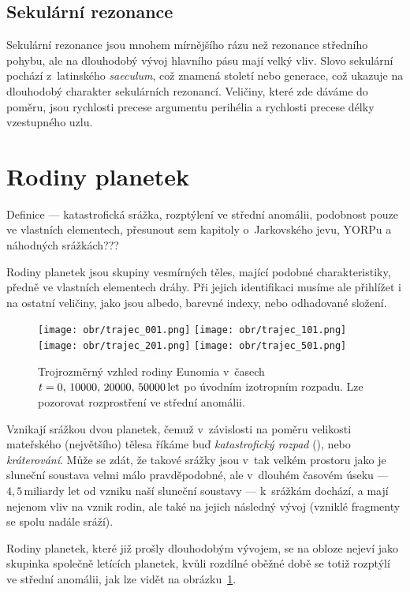 \documentclass[A4paper, 12pt, oneside]{book}%
\newcommand{\I}[1]{\textit{#1}}
\begin{document}
\subsection{Sekulární rezonance} 
Sekulární rezonance jsou mnohem mírnějšího rázu než rezonance středního pohybu, ale na dlouhodobý vývoj hlavního pásu mají velký vliv. Slovo sekulární pochází z~latinského \I{saeculum}, což znamená století nebo generace, což ukazuje na dlouhodobý charakter sekulárních rezonancí. Veličiny, které zde dáváme do poměru, jsou rychlosti precese argumentu perihélia a rychlosti precese délky vzestupného uzlu. 
\section{Rodiny planetek}


Definice --- katastrofická srážka, rozptýlení ve střední anomálii, podobnost pouze ve vlastních elementech, přesunout sem kapitoly o~Jarkovského jevu, YORPu a náhodných srážkách???

Rodiny planetek jsou skupiny vesmírných těles, mající podobné charakteristiky, předně ve vlastních elementech dráhy. Při jejich identifikaci musíme ale přihlížet i na ostatní veličiny, jako jsou albedo, barevné indexy, nebo odhadované složení. 

\begin{figure}
	\centering
	\texttt{[image: obr/trajec\_001.png]}
	\texttt{[image: obr/trajec\_101.png]} \\
	\texttt{[image: obr/trajec\_201.png]}
	\texttt{[image: obr/trajec\_501.png]}
	\caption{Trojrozměrný vzhled rodiny Eunomia v~časech $t=0,\,10000,\,20000,\,50000\,{\rm let}$ po úvodním izotropním rozpadu. Lze pozorovat rozprostření ve střední anomálii.} \label{fig:trajec}
\end{figure}

Vznikají srážkou dvou planetek, čemuž v~závislosti na poměru velikosti mateřského (největšího) tělesa říkáme buď \I{katastrofický rozpad} (), nebo \I{kráterování}. Může se zdát, že takové srážky jsou v~tak velkém prostoru jako je sluneční soustava velmi málo pravděpodobné, ale v~dlouhém časovém úseku --- $4,5\,\text{miliardy let}$ od vzniku naší sluneční soustavy --- k~srážkám dochází, a mají nejenom vliv na vznik rodin, ale také na jejich následný vývoj (vzniklé fragmenty se spolu nadále sráží).


Rodiny planetek, které již prošly dlouhodobým vývojem, se na obloze nejeví jako skupinka společně letících planetek, kvůli rozdílné oběžné době se totiž rozptýlí ve střední anomálii, jak lze vidět na obrázku~\ref{fig:trajec}.
\end{document}
